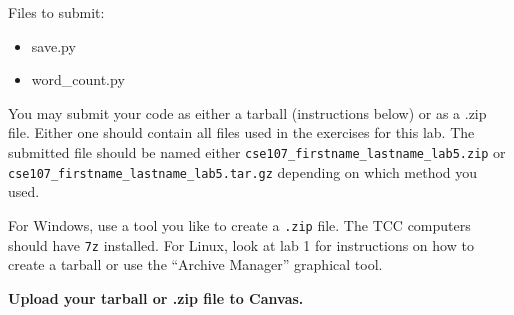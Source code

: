 \documentclass[11pt]{cselabheader}
\begin{document}
Files to submit:
\begin{itemize}
\item save.py
\item word\_count.py
\end{itemize}

You may submit your code as either a tarball (instructions below) or as a .zip
file. Either one should contain all files used in the exercises for this lab.
The submitted file should be named either
\texttt{cse107\_firstname\_lastname\_lab5.zip} or
\texttt{cse107\_firstname\_lastname\_lab5.tar.gz} depending on which method you
used.

For Windows, use a tool you like to create a \texttt{.zip} file. The TCC
computers should have \texttt{7z} installed. For Linux, look at lab 1 for
instructions on how to create a tarball or use the ``Archive Manager'' graphical
tool.

\begin{center}
  \textbf{Upload your tarball or .zip file to Canvas.}
\end{center}
\end{document}
